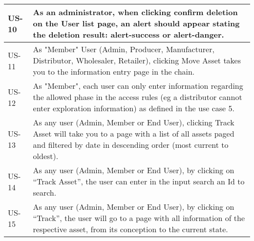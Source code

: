 \begin{table}[H]
\begin{tabular}{|l|p{13.5cm}|}
    \hline
    US-10 & As an administrator, when clicking confirm deletion on the User list page, an alert should appear stating the deletion result: alert-success or alert-danger.\\
    \hline
    US-11 & As "Member" User (Admin, Producer, Manufacturer, Distributor, Wholesaler, Retailer), clicking Move Asset takes you to the information entry page in the chain.\\
    \hline
    US-12 & As "Member", each user can only enter information regarding the allowed phase in the access rules (eg a distributor cannot enter exploration information) as defined in the use case 5.\\
    \hline
    US-13 & As any user (Admin, Member or End User), clicking Track Asset will take you to a page with a list of all assets paged and filtered by date in descending order (most current to oldest).\\
    \hline
    US-14 & As any user (Admin, Member or End User), by clicking on “Track Asset”, the user can enter in the input search an Id to search.\\
    \hline
    US-15 & As any user (Admin, Member or End User), by clicking on “Track”, the user will go to a page with all information of the respective asset, from its conception to the current state.\\
    \hline
    \end{tabular}
\end{table}